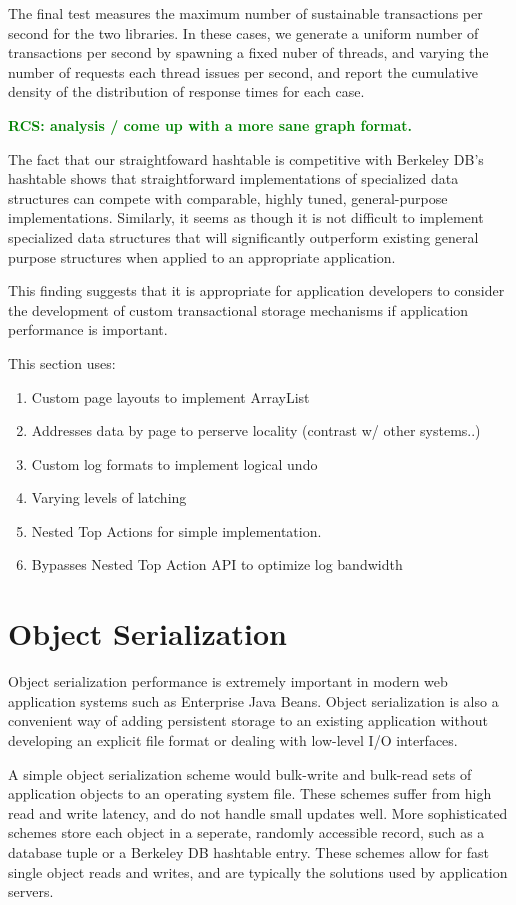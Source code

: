 \documentclass[letterpaper,twocolumn,english]{article}
\newcommand{\rcs}[1]{\textcolor{green}{\bf RCS: #1}}
\begin{document}
The final test measures the maximum number of sustainable transactions
per second for the two libraries.  In these cases, we generate a
uniform number of transactions per second by spawning a fixed nuber of
threads, and varying the number of requests each thread issues per
second, and report the cumulative density of the distribution of
response times for each case.

\rcs{analysis / come up with a more sane graph format.}

The fact that our straightfoward hashtable is competitive with Berkeley DB's hashtable shows that
straightforward implementations of specialized data structures can 
compete with comparable, highly tuned, general-purpose implementations.  
Similarly, it seems as though it is not difficult to implement specialized 
data structures that will significantly outperform existing 
general purpose structures when applied to an appropriate application.

This finding suggests that it is appropriate for
application developers to consider the development of custom
transactional storage mechanisms if application performance is
important.

This section uses:
\begin{enumerate}
\item{Custom page layouts to implement ArrayList}
\item{Addresses data by page to perserve locality (contrast w/ other systems..)}
\item{Custom log formats to implement logical undo}
\item{Varying levels of latching}
\item{Nested Top Actions for simple implementation.}
\item{Bypasses Nested Top Action API to optimize log bandwidth}
\end{enumerate}

\section{Object Serialization}
\label{OASYS}

Object serialization performance is extremely important in modern web
application systems such as Enterprise Java Beans.  Object
serialization is also a convenient way of adding persistent storage to
an existing application without developing an explicit file format or
dealing with low-level I/O interfaces.

A simple object serialization scheme would bulk-write and bulk-read
sets of application objects to an operating system file.  These
schemes suffer from high read and write latency, and do not handle
small updates well.  More sophisticated schemes store each object in a
seperate, randomly accessible record, such as a database tuple or
a Berkeley DB hashtable entry.  These schemes allow for fast single
object reads and writes, and are typically the solutions used by
application servers.
\end{document}
